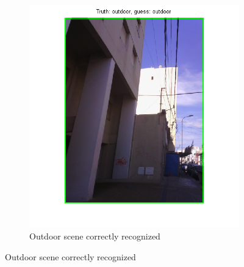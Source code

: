 \begin{figure}[htb]
\begin{subfigure}[t]{0.4\textwidth}
		\includegraphics[width=\textwidth]{./img/ex2/outdoor-nailed.png}
		\caption{Outdoor scene correctly recognized}
		\label{fig:outdoor-nailed}
	\end{subfigure}
	

\end{figure}
